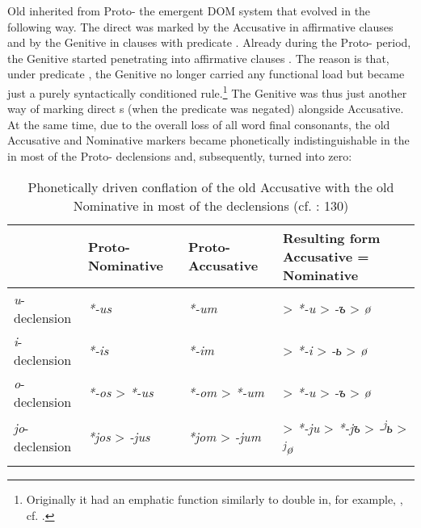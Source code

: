 \documentclass[output=paper]{langsci/langscibook}
\begin{document}
Old  inherited from Proto- the emergent DOM system that evolved in the following way. The direct  was marked by the Accusative  in affirmative clauses and by the Genitive  in clauses with predicate . Already during the Proto- period, the Genitive started penetrating into affirmative  clauses \citep{Klenin1983}. The reason is that, under predicate , the Genitive no longer carried any functional load but became just a purely syntactically conditioned rule.\footnote{Originally it had an emphatic function similarly to double  in, for example, , cf. \citet{Kuryłowicz1971}.} The Genitive was thus just another way of marking direct s (when the predicate was negated) alongside Accusative. At the same time, due to the overall loss of all word final consonants, the old Accusative and Nominative markers became phonetically indistinguishable in the  in most of the Proto- declensions and, subsequently, turned into zero:

\begin{table}
\begin{tabularx}{\textwidth}{lp{2.3cm}p{2.3cm}Q}
\lsptoprule
\bfseries ~ & \bfseries Proto- Nominative & \bfseries Proto- Accusative & {\bfseries Resulting form}
\bfseries Accusative = Nominative\\
\midrule
\textit{u}{}-declension & \textit{*-us} & \textit{*-um} & > \textit{*-u} > \textit{-{ъ}} > \textit{ø}\\
\textit{i}{}-declension & \textit{*-is} & \textit{*-im} & > \textit{*-i} > \textit{-{ь}} > \textit{ø}\\
\textit{o}{}-declension & \textit{*-os} > \textit{*-us} & \textit{*-om} > \textit{*-um} & > \textit{*-u} > \textit{-{ъ}} > \textit{ø}\\
\textit{jo}{}-declension & \textit{*jos} > \textit{-jus} & \textit{*jom} > \textit{-jum} & > \textit{*-ju} > \textit{*}\textit{{}-j}\textit{{ъ} }> \textit{-\textsuperscript{j}}\textit{{ь}} > \textit{\textsuperscript{j}}\textit{ø}\\
\lspbottomrule
\end{tabularx}

\caption{Phonetically driven conflation of the old Accusative with the old Nominative in most of the declensions (cf. \citealt{Arumaa1985}: 130)}
\label{tab:serzant:1}
\end{table}
\end{document}
